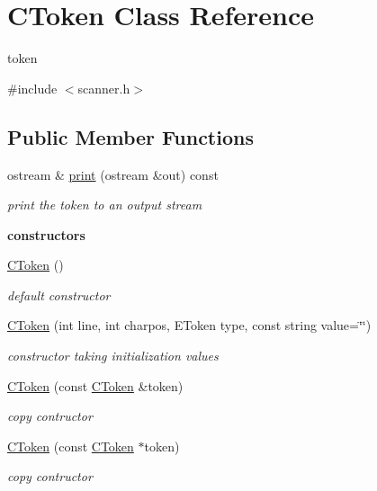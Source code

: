 \hypertarget{classCToken}{\section{C\-Token Class Reference}
\label{classCToken}
}


token  




{\ttfamily \#include $<$scanner.\-h$>$}

\subsection*{Public Member Functions}
\begin{DoxyCompactItemize}
\item 
ostream \& \hyperlink{classCToken_a0c6d9ec1b5a54894f8465be2a2d810e3}{print} (ostream \&out) const 
\begin{DoxyCompactList}\small\item\em print the token to an output stream \end{DoxyCompactList}\end{DoxyCompactItemize}
\begin{Indent}{\bf constructors}\par
\begin{DoxyCompactItemize}
\item 
\hypertarget{classCToken_a5fe716294f748b7164d32df1ad97a181}{\hyperlink{classCToken_a5fe716294f748b7164d32df1ad97a181}{C\-Token} ()}\label{classCToken_a5fe716294f748b7164d32df1ad97a181}

\begin{DoxyCompactList}\small\item\em default constructor \end{DoxyCompactList}\item 
\hyperlink{classCToken_a2dcf42551c105b53a0d0a73c6be7d7f5}{C\-Token} (int line, int charpos, E\-Token type, const string value=\char`\"{}\char`\"{})
\begin{DoxyCompactList}\small\item\em constructor taking initialization values \end{DoxyCompactList}\item 
\hyperlink{classCToken_af690f8b021e8653d30fb18817946839c}{C\-Token} (const \hyperlink{classCToken}{C\-Token} \&token)
\begin{DoxyCompactList}\small\item\em copy contructor \end{DoxyCompactList}\item 
\hyperlink{classCToken_a054dd4c26d2d689424968aa749b2e6f6}{C\-Token} (const \hyperlink{classCToken}{C\-Token} $\ast$token)
\begin{DoxyCompactList}\small\item\em copy contructor \end{DoxyCompactList}\end{DoxyCompactItemize}
\end{Indent}
